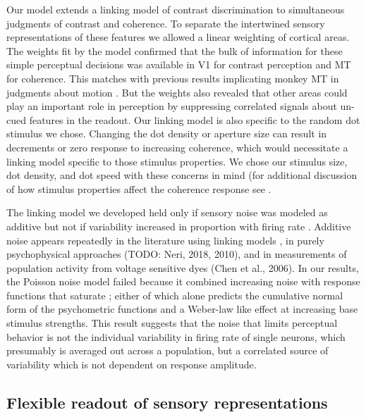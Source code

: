 \documentclass{report}
\begin{document}
Our model extends a linking model of contrast discrimination \citep{Boynton1999-jd} to simultaneous judgments of contrast and coherence. To separate the intertwined sensory representations of these features we allowed a linear weighting of cortical areas. The weights fit by the model confirmed that the bulk of information for these simple perceptual decisions was available in V1 for contrast perception and MT for coherence. This matches with previous results implicating monkey MT in judgments about motion \citep{Britten1996-ik,Katz2016-xc,Newsome1988-os}. But the weights also revealed that other areas could play an important role in perception by suppressing correlated signals about un-cued features in the readout. Our linking model is also specific to the random dot stimulus we chose. Changing the dot density \citep{Smith2006-cb} or aperture size \citep{Ajina2015-xm,Becker2008-uj,Costagli2014-kg} can result in decrements or zero response to increasing coherence, which would necessitate a linking model specific to those stimulus properties. We chose our stimulus size, dot density, and dot speed with these concerns in mind (for additional discussion of how stimulus properties affect the coherence response see \citet{Birman2018-sp}.  

The linking model we developed held only if sensory noise was modeled as additive but not if variability increased in proportion with firing rate \citep{Softky1993-ki}. Additive noise appears repeatedly in the literature using linking models \citep{Boynton1999-jd,Hara2014-mv,Pestilli2011-gi,Sapir2005-ri}, in purely psychophysical approaches \citep{Gorea2001-yt} (TODO: Neri, 2018, 2010), and in measurements of population activity from voltage sensitive dyes (Chen et al., 2006). In our results, the Poisson noise model failed because it combined increasing noise with response functions that saturate \citep{Birman2018-sp}; either of which alone predicts the cumulative normal form of the psychometric functions and a Weber-law like effect at increasing base stimulus strengths. This result suggests that the noise that limits perceptual behavior is not the individual variability in firing rate of single neurons, which presumably is averaged out across a population, but a correlated source of variability which is not dependent on response amplitude.

\subsection{Flexible readout of sensory representations}
\end{document}
